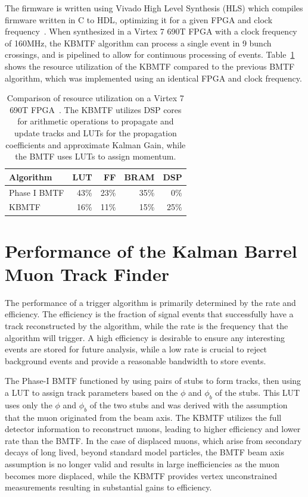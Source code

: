 The firmware is written using Vivado High Level Synthesis (HLS) which compiles firmware written in C to HDL, optimizing it for a given FPGA and clock frequency~\cite{Bachtis:2648953}. When synthesized in a Virtex 7 690T FPGA with a clock frequency of 160\unit{MHz}, the KBMTF algorithm can process a single event in 9 bunch crossings, and is pipelined to allow for continuous processing of events. Table~\ref{tab:kmtfFW} shows the resource utilization of the KBMTF compared to the previous BMTF algorithm, which was implemented using an identical FPGA and clock frequency.

\begin{table} [htb!]
	\centering
	\begin{tabular}{|l|r r r r|}
	\hline
	Algorithm & LUT & FF & BRAM & DSP \\
	\hline
	Phase I BMTF & 43\% & 23\% & 35\% & 0\%\\
	KBMTF & 16\% & 11\% & 15\% & 25\% \\
	\hline 
	\end{tabular}
	\caption[Comparison of resource utilization on a Virtex 7 690T FPGA~\cite{CERN-LHCC-2020-004}. The KBMTF utilizes DSP cores for arithmetic operations to propagate and update tracks and LUTs for the propagation coefficients and approximate Kalman Gain, while the BMTF uses LUTs to assign momentum.]
	{Comparison of resource utilization on a Virtex 7 690T FPGA~\cite{CERN-LHCC-2020-004}. The KBMTF utilizes DSP cores for arithmetic operations to propagate and update tracks and LUTs for the propagation coefficients and approximate Kalman Gain, while the BMTF uses LUTs to assign momentum.}
	\label{tab:kmtfFW}
\end{table}

\section{Performance of the Kalman Barrel Muon Track Finder} \label{sec:kmtf_performance}
The performance of a trigger algorithm is primarily determined by the rate and efficiency. The efficiency is the fraction of signal events that successfully have a track reconstructed by the algorithm, while the rate is the frequency that the algorithm will trigger. A high efficiency is desirable to ensure any interesting events are stored for future analysis, while a low rate is crucial to reject background events and provide a reasonable bandwidth to store events.

The Phase-I BMTF functioned by using pairs of stubs to form tracks, then using a LUT to assign track parameters based on the $\phi$ and $\phi_b$ of the stubs. This LUT uses only the $\phi$ and $\phi_b$ of the two stubs and was derived with the assumption that the muon originated from the beam axis. The KBMTF utilizes the full detector information to reconstruct muons, leading to higher efficiency and lower rate than the BMTF. In the case of displaced muons, which arise from secondary decays of long lived, beyond standard model particles, the BMTF beam axis assumption is no longer valid and results in large inefficiencies as the muon becomes more displaced, while the KBMTF provides vertex unconstrained measurements resulting in substantial gains to efficiency.

